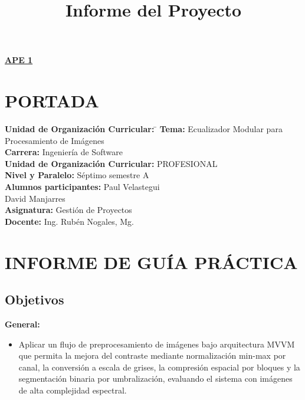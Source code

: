 \documentclass[11pt]{article}
\title{Informe del Proyecto}
\begin{document}
\renewcommand{\figurename}{Figura}
\renewcommand{\thesection}{\Roman{section}}
\begin{center}
    \textbf{\underline{\normalsize APE 1}}
\end{center}

\section{PORTADA}

\begin{tabbing}
    \textbf{Unidad de Organización Curricular:}\hspace{1cm} \= \kill
    \textbf{Tema:} \> Ecualizador Modular para Procesamiento de Imágenes \\[0.25em]
    \textbf{Carrera:} \> Ingeniería de Software \\[0.25em]
    \textbf{Unidad de Organización Curricular:} \> PROFESIONAL \\[0.25em]
    \textbf{Nivel y Paralelo:} \> Séptimo semestre A \\[0.25em]
    \textbf{Alumnos participantes:} \> Paul Velastegui \\
    \> David Manjarres \\[0.25em]
    \textbf{Asignatura:} \> Gestión de Proyectos \\[0.25em]
    \textbf{Docente:} \> Ing. Rubén Nogales, Mg.
\end{tabbing}

\section{INFORME DE GUÍA PRÁCTICA}
\renewcommand{\thesection}{\arabic{section}}

\subsection{Objetivos}
\textbf{General:}
\begin{itemize}
    \item Aplicar un flujo de preprocesamiento de imágenes bajo arquitectura MVVM que permita la mejora del contraste mediante normalización min-max por canal, la conversión a escala de grises, la compresión espacial por bloques y la segmentación binaria por umbralización, evaluando el sistema con imágenes de alta complejidad espectral.
\end{itemize}
\end{document}
